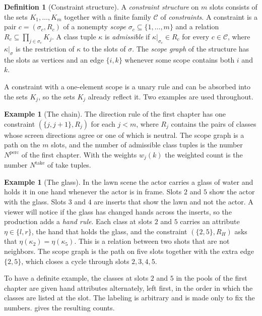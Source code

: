 \documentclass[11pt,twoside,openright]{book}
\theoremstyle{plain}
\theoremstyle{definition}
\newtheorem{definition}[theorem]{Definition}
\newtheorem{example}[theorem]{Example}
\theoremstyle{remark}
\begin{document}
\begin{definition}[Constraint structure]\label{def:structure}
A \emph{constraint structure} on $m$ slots consists of the sets $K_1,\dots,K_m$ together with a finite family $\mathcal C$ of \emph{constraints}. A constraint is a pair $c=(\sigma_c,R_c)$ of a nonempty \emph{scope} $\sigma_c\subseteq\{1,\dots,m\}$ and a relation $R_c\subseteq\prod_{j\in\sigma_c}K_j$. A class tuple $\kappa$ is \emph{admissible} if $\kappa|_{\sigma_c}\in R_c$ for every $c\in\mathcal C$, where $\kappa|_{\sigma}$ is the restriction of $\kappa$ to the slots of $\sigma$. The \emph{scope graph} of the structure has the slots as vertices and an edge $\{i,k\}$ whenever some scope contains both $i$ and $k$.
\end{definition}

A constraint with a one-element scope is a unary rule and can be absorbed into the sets $K_j$, so the sets $K_j$ already reflect it. Two examples are used throughout.

\begin{example}[The chain]\label{ex:chain}
The direction rule of the first chapter has one constraint $(\{j,j+1\},R_j)$ for each $j<m$, where $R_j$ contains the pairs of classes whose screen directions agree or one of which is neutral. The scope graph is a path on the $m$ slots, and the number of admissible class tuples is the number $N^{\mathrm{perc}}$ of the first chapter. With the weights $w_j(k)$ the weighted count is the number $N^{\mathrm{take}}$ of take tuples.
\end{example}

\begin{example}[The glass]\label{ex:glass}
In the lawn scene the actor carries a glass of water and holds it in one hand whenever the actor is in frame. Slots $2$ and $5$ show the actor with the glass. Slots $3$ and $4$ are inserts that show the lawn and not the actor. A viewer will notice if the glass has changed hands across the inserts, so the production adds a \emph{hand rule}. Each class at slots $2$ and $5$ carries an attribute $\eta\in\{l,r\}$, the hand that holds the glass, and the constraint $(\{2,5\},R_H)$ asks that $\eta(\kappa_2)=\eta(\kappa_5)$. This is a relation between two shots that are not neighbors. The scope graph is the path on five slots together with the extra edge $\{2,5\}$, which closes a cycle through slots $2,3,4,5$.
\end{example}

To have a definite example, the classes at slots $2$ and $5$ in the pools of the first chapter are given hand attributes alternately, left first, in the order in which the classes are listed at the slot. The labeling is arbitrary and is made only to fix the numbers.  gives the resulting counts.
\end{document}
